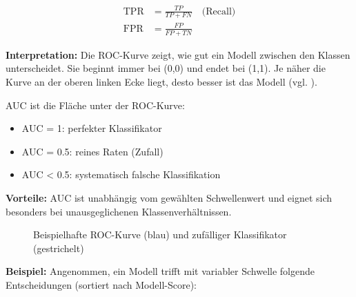 \begin{align*}
\mathrm{TPR} &= \frac{TP}{TP + FN} \quad \text{(Recall)} \\
\mathrm{FPR} &= \frac{FP}{FP + TN}
\end{align*}

\textbf{Interpretation:}  
Die \ac{ROC}-Kurve zeigt, wie gut ein Modell zwischen den Klassen unterscheidet. Sie
beginnt immer bei (0,0) und endet bei (1,1). Je näher die Kurve an der oberen
linken Ecke liegt, desto besser ist das Modell (vgl. \cite{Miller2024}).

\ac{AUC} ist die Fläche unter der ROC-Kurve:
\begin{itemize}
  \item AUC = 1: perfekter Klassifikator
  \item AUC = 0.5: reines Raten (Zufall)
  \item AUC < 0.5: systematisch falsche Klassifikation
\end{itemize}

\textbf{Vorteile:}  
AUC ist unabhängig vom gewählten Schwellenwert und eignet sich besonders bei unausgeglichenen Klassenverhältnissen.

\begin{figure}[ht]
  \centering
  \caption{Beispielhafte ROC-Kurve (blau) und zufälliger Klassifikator (gestrichelt)}
  \label{fig:roc}
\end{figure}

\textbf{Beispiel:}  
Angenommen, ein Modell trifft mit variabler Schwelle folgende Entscheidungen (sortiert nach Modell-Score):

